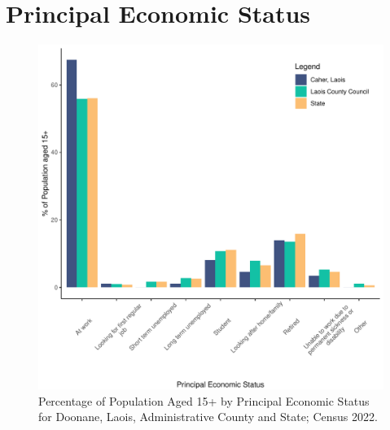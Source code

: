 \documentclass{article}
\begin{document}
  
\pagebreak
\section{Principal Economic Status}\label{sect:PES}
\begin{figure}[H]
	\centering
	\includegraphics[width = 140mm]{../figures/PESED.pdf}
	\caption{Percentage of Population Aged 15+ by Principal Economic Status for Doonane, Laois, Administrative County and State; Census 2022.}
	\label{fig:vbnv}
	\end{figure}
\end{document}
